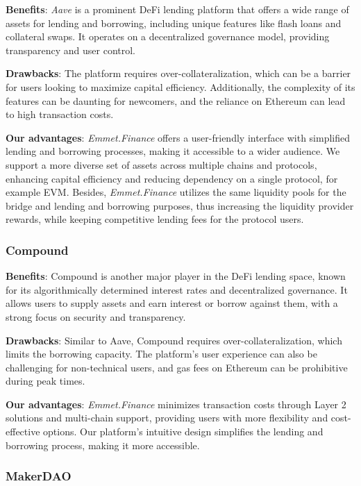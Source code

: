 \documentclass[12pt, a4paper]{article}
\begin{document}
\textbf{Benefits}: \textit{Aave} is a prominent DeFi lending platform that offers a wide range of assets for lending and borrowing, including unique features like flash loans and collateral swaps. It operates on a decentralized governance model, providing transparency and user control.

\textbf{Drawbacks}: The platform requires over-collateralization, which can be a barrier for users looking to maximize capital efficiency. Additionally, the complexity of its features can be daunting for newcomers, and the reliance on Ethereum can lead to high transaction costs.

\textbf{Our advantages}: \textit{Emmet.Finance} offers a user-friendly interface with simplified lending and borrowing processes, making it accessible to a wider audience. We support a more diverse set of assets across multiple chains and protocols, enhancing capital efficiency and reducing dependency on a single protocol, for example EVM. Besides, \textit{Emmet.Finance} utilizes the same liquidity pools for the bridge and lending and borrowing purposes, thus increasing the liquidity provider rewards, while keeping competitive lending fees for the protocol users.

\subsubsection{Compound}

\textbf{Benefits}: Compound is another major player in the DeFi lending space, known for its algorithmically determined interest rates and decentralized governance. It allows users to supply assets and earn interest or borrow against them, with a strong focus on security and transparency.

\textbf{Drawbacks}: Similar to Aave, Compound requires over-collateralization, which limits the borrowing capacity. The platform's user experience can also be challenging for non-technical users, and gas fees on Ethereum can be prohibitive during peak times.

\textbf{Our advantages}: \textit{Emmet.Finance} minimizes transaction costs through Layer 2 solutions and multi-chain support, providing users with more flexibility and cost-effective options. Our platform's intuitive design simplifies the lending and borrowing process, making it more accessible.

\subsubsection{MakerDAO}
\end{document}
